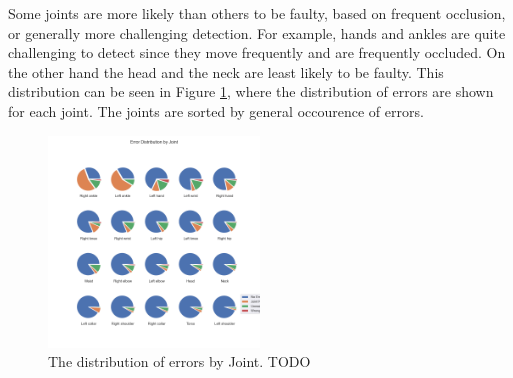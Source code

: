 Some joints are more likely than others to be faulty, based on frequent occlusion, or generally more challenging detection. For example, hands and ankles are quite challenging to detect since they move frequently and are frequently occluded. On the other hand the head and the neck are least likely to be faulty. This distribution can be seen in Figure \ref{fig:statistics_err_dist_joint}, where the distribution of errors are shown for each joint. The joints are sorted by general occourence of errors.

\begin{figure}
  \centering
  \includegraphics[width=0.5\textwidth]{figures/Data/Error_Distribution_by_Joint.png}
  \caption[Error Distribution by Joint]{The distribution of errors by Joint. TODO}
  \label{fig:statistics_err_dist_joint}
\end{figure}
